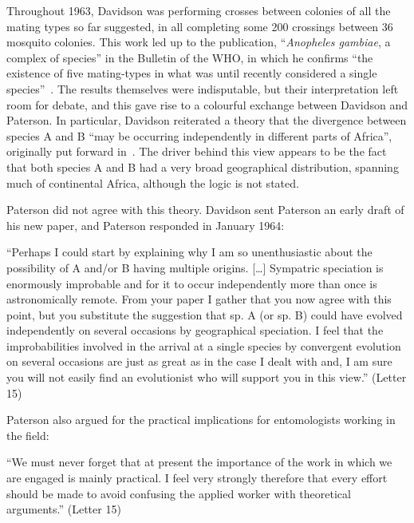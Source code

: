 \documentclass[a4paper,11pt,abstracton,hidelinks]{scrartcl}
\begin{document}
Throughout 1963, Davidson was performing crosses between colonies of all the mating types so far suggested, in all completing some 200 crossings between 36 mosquito colonies.
%
This work led up to the publication, ``\textit{Anopheles gambiae}, a complex of species'' in the Bulletin of the WHO, in which he confirms ``the existence of five mating-types in what was until recently considered a single species''~\parencite{Davidson1964}.
%
The results themselves were indisputable, but their interpretation left room for debate, and this gave rise to a colourful exchange between Davidson and Paterson.
In particular, Davidson reiterated a theory that the divergence between species A and B ``may be occurring independently in different parts of Africa'', originally put forward in~\textcite{Davidson1962a}.
%
The driver behind this view appears to be the fact that both species A and B had a very broad geographical distribution, spanning much of continental Africa, although the logic is not stated.


Paterson did not agree with this theory.
%
Davidson sent Paterson an early draft of his new paper, and Paterson responded in January 1964:


\begin{displayquote}
``Perhaps I could start by explaining why I am so unenthusiastic about the possibility of A and/or B having multiple origins. [\ldots] Sympatric speciation is enormously improbable and for it to occur independently more than once is astronomically remote. From your paper I gather that you now agree with this point, but you substitute the suggestion that sp. A (or sp. B) could have evolved independently on several occasions by geographical speciation. I feel that the improbabilities involved in the arrival at a single species by convergent evolution on several occasions are just as great as in the case I dealt with and, I am sure you will not easily find an evolutionist who will support you in this view.'' (Letter 15)
\end{displayquote}


Paterson also argued for the practical implications for entomologists working in the field:


\begin{displayquote}
``We must never forget that at present the importance of the work in which we are engaged is mainly practical. I feel very strongly therefore that every effort should be made to avoid confusing the applied worker with theoretical arguments.'' (Letter 15)
\end{displayquote}
\end{document}
